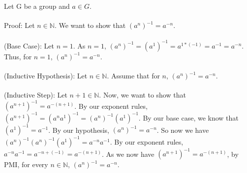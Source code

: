 \documentclass[11pt]{amsart}
\begin{document}
Let G be a group and $a\in G$.
\\
\\Proof: Let $n\in \mathbb{N}$. We want to show that $(a^{n})^{-1}=a^{-n}$. 
\\
\\(Base Case): Let $n=1$. As $n=1$, $(a^{n})^{-1}=(a^{1})^{-1}=a^{1*(-1)}=a^{-1}=a^{-n}$. Thus, for $n=1$, $(a^{n})^{-1}=a^{-n}$.\\
\\(Inductive Hypothesis): Let $n\in \mathbb{N}$. Assume that for $n$, $(a^{n})^{-1}=a^{-n}$. \\
\\(Inductive Step): Let $n+1\in \mathbb{N}$. Now, we want to show that $(a^{n+1})^{-1}=a^{-(n+1)}$. By our exponent rules, $(a^{n+1})^{-1}=(a^{n}a^{1})^{-1}=(a^{n})^{-1}(a^{1})^{-1}$. By our base case, we know that $(a^{1})^{-1} = a^{-1}$. By our hypothesis, $(a^{n})^{-1}=a^{-n}$. So now we have $(a^{n})^{-1}(a^{n})^{-1}(a^{1})^{-1}=a^{-n}a^{-1}$. By our exponent rules, $a^{-n}a^{-1}=a^{-n+(-1)}=a^{-(n+1)}$. As we now have $(a^{n+1})^{-1}=a^{-(n+1)}$, by PMI, for every $n \in \mathbb{N}$, $(a^n)^{-1} = a^{-n}$.
\vskip 0.5in
\end{document}
